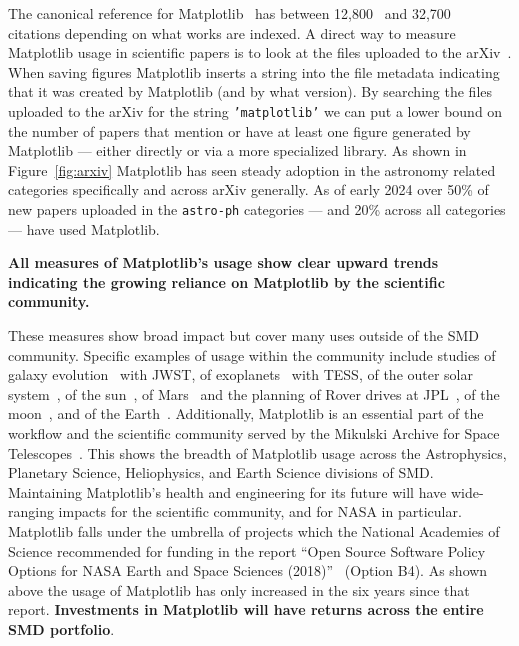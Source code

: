 \documentclass[12pt]{article}
\numberwithin{page}{section}
\begin{document}
The canonical reference for
Matplotlib~\cite{Hunter:2007} has between 12,800~\cite{ads_mpl} and
32,700~\cite{gs_cites} citations depending on what works are indexed.  A direct
way to measure Matplotlib usage in scientific papers is to look at the files
uploaded to the arXiv~\cite{arxiv_stats}.  When saving figures Matplotlib
inserts a string into the file metadata indicating that it was created by
Matplotlib (and by what version).  By searching the files uploaded to the arXiv
for the string \texttt{'matplotlib'} we can put a lower bound
on the number of papers that mention or have at least one figure generated by
Matplotlib --- either directly or via a more specialized library.  As shown in
Figure~\ref{fig:arxiv} Matplotlib has seen steady adoption in the astronomy
related categories specifically and across arXiv generally.  As of early 2024
over 50\% of new papers uploaded in the \texttt{astro-ph} categories --- and
20\% across all categories --- have used Matplotlib.

\textbf{All measures of Matplotlib's usage show clear upward trends indicating the
growing reliance on Matplotlib by the scientific community.}

These measures show broad impact but cover many uses outside of the
SMD community.  Specific examples of usage within the community include
studies of galaxy evolution~\cite{2022ApJ...940L..14N} with JWST,
of exoplanets~\cite{2020AJ....160..116G, Barclay_2018,2019AJ....158...27L} with TESS,
of the outer solar system~\cite{Emran_2023},
of the sun~\cite{Stangalini2022},
of Mars~\cite{2022JE007697} and the planning of Rover drives at JPL~\cite{acurtis},
of the moon~\cite{NESNAS2023163},
and of the Earth~\cite{paolo_2024}.
Additionally, Matplotlib is an essential part of the workflow and the
scientific community served by the Mikulski Archive for Space
Telescopes~\cite{Tollerud}.  This shows the breadth of Matplotlib usage across
the Astrophysics, Planetary Science, Heliophysics, and Earth Science divisions
of SMD.  Maintaining Matplotlib's health and engineering for its future will
have wide-ranging impacts for the scientific community, and for NASA in
particular.
Matplotlib falls under the umbrella of projects which the National Academies of
Science recommended for funding in the report ``Open Source Software Policy
Options for NASA Earth and Space Sciences (2018)''~\cite{NAP25217} (Option B4).
As shown above the usage of Matplotlib has only increased in the six years since
that report.  \textbf{Investments in Matplotlib will have returns across the
  entire SMD portfolio}.
\end{document}
